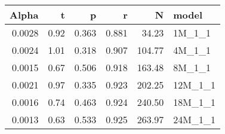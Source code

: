\begin{table}[ht]
\centering
\begin{tabular}{rrrrrl}
  \hline
Alpha & t & p & r & N & model \\ 
  \hline
0.0028 & 0.92 & 0.363 & 0.881 & 34.23 & 1M\_1\_1 \\ 
  0.0024 & 1.01 & 0.318 & 0.907 & 104.77 & 4M\_1\_1 \\ 
  0.0015 & 0.67 & 0.506 & 0.918 & 163.48 & 8M\_1\_1 \\ 
  0.0021 & 0.97 & 0.335 & 0.923 & 202.25 & 12M\_1\_1 \\ 
  0.0016 & 0.74 & 0.463 & 0.924 & 240.50 & 18M\_1\_1 \\ 
  0.0013 & 0.63 & 0.533 & 0.925 & 263.97 & 24M\_1\_1 \\ 
   \hline
\end{tabular}
\end{table}

